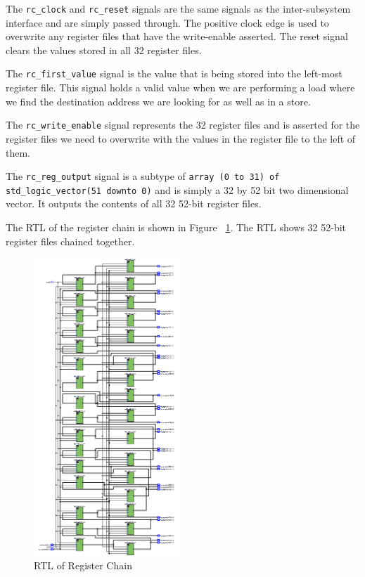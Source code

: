\documentclass{article}
\begin{document}
The \texttt{rc\_clock} and \texttt{rc\_reset} signals are the same signals as the inter-subsystem interface and are simply passed through. The positive clock edge is used to overwrite any register files that have the write-enable asserted. The reset signal clears the values stored in all 32 register files.

The \texttt{rc\_first\_value} signal is the value that is being stored into the left-most register file. This signal holds a valid value when we are performing a load where we find the destination address we are looking for as well as in a store. 

The \texttt{rc\_write\_enable} signal represents the 32 register files and is asserted for the register files we need to overwrite with the values in the register file to the left of them. 

The \texttt{rc\_reg\_output} signal is a subtype of \texttt{array (0 to 31) of std\_logic\_vector(51 downto 0)} and is simply a 32 by 52 bit two dimensional vector. It outputs the contents of all 32 52-bit register files.

The RTL of the register chain is shown in Figure ~\ref{fig:regchain-rtl}. The RTL shows 32 52-bit register files chained together.

\begin{figure}[ht!]
  \centering
    \includegraphics[width=0.5\textwidth]{register_chain_rtl.PNG}
  \caption{RTL of Register Chain}
  \label{fig:regchain-rtl}
\end{figure}
\end{document}
